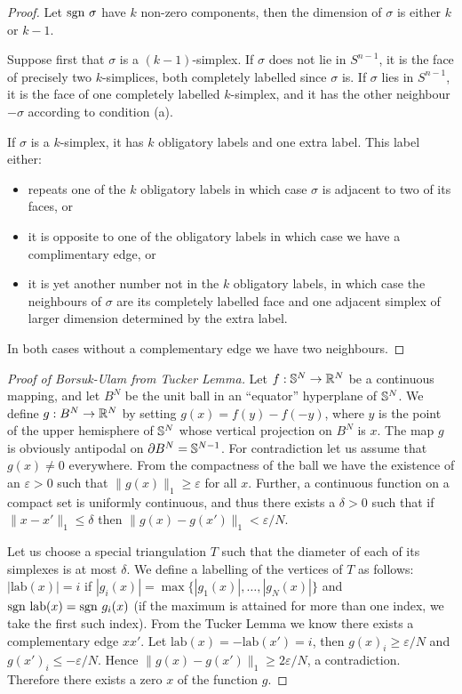 \begin{proof}
    Let $\text{sgn } \sigma$ have $k$ non-zero components, then the dimension of $\sigma$ is either $k$ or $k-1$. 

    Suppose first that $\sigma$ is a $(k-1)$-simplex. If $\sigma$ does not lie in $S^{n-1}$, it is the face of precisely two $k$-simplices, both completely labelled since $\sigma$ is.  If $\sigma$ lies in $S^{n-1}$, it is the face of one completely labelled $k$-simplex, and it has the other neighbour $-\sigma$ according to condition (a).

    If $\sigma$ is a $k$-simplex, it has $k$ obligatory labels and one extra label. This label either:
    \begin{itemize}
        \item repeats one of the $k$ obligatory labels in which case $\sigma$ is adjacent to two of its faces, or
        \item it is opposite to one of the obligatory labels in which case we have a complimentary edge, or \item it is yet another number not in the $k$ obligatory labels, in which case the neighbours of $\sigma$ are its completely labelled face and one adjacent simplex of larger dimension determined by the extra label. 
    \end{itemize}
    In both cases without a complementary edge we have two neighbours.
\end{proof}

\begin{proof}[Proof of Borsuk-Ulam from Tucker Lemma]
    Let $f: \mathbb S^N \to \mathbb R^N$ be a continuous mapping, and let $B^N$ be the unit ball in an ``equator'' hyperplane of $\mathbb S^N$. 
    We define $g: B^N \to \mathbb R^N$ by setting $g(x) = f(y) - f(-y)$, where $y$ is the point of the upper hemisphere of $\mathbb S^N$ whose vertical projection on $B^N$ is $x$. 
    The map $g$ is obviously antipodal on $\partial B^N = \mathbb S^{N-1}$. For contradiction let us assume that $g(x) \neq 0$ everywhere. 
    From the compactness of the ball we have the existence of an $\varepsilon > 0$ such that $\|g(x)\|_1 \geq \varepsilon$ for all $x$. 
    Further, a continuous function on a compact set is uniformly continuous, and thus there exists a $\delta > 0$ such that if $\| x - x' \|_1 \leq \delta$ then $\|g(x) - g(x')\|_1 < \varepsilon/N$.
    
    Let us choose a special triangulation $T$ such that the diameter of each of its simplexes is at most $\delta$. 
    We define a labelling of the vertices of $T$ as follows: $|\text{lab}(x)| = i$ if $|g_i(x)| = \max \{|g_1(x)|, \dots, |g_N(x)| \}$ and $\text{sgn } \text{lab} (x) = \text{sgn } g_i(x)$ (if the maximum is attained for more than one index, we take the first such index). 
    From the Tucker Lemma we know there exists a complementary edge $xx'$. Let $\text{lab}(x) = -\text{lab}(x') = i$, then $g(x)_i \geq \varepsilon/N$ and $g(x')_i \leq -\varepsilon/N$. Hence $\|g(x) - g(x') \|_1 \geq 2\varepsilon / N$, a contradiction. Therefore there exists a zero $x$ of the function $g$.
\end{proof}